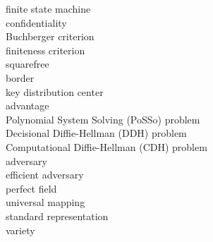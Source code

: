 \begin{latin}
finite state machine\dotfill {}\\
confidentiality\dotfill {}\\
Buchberger criterion\dotfill {}\\
finiteness criterion\dotfill {}\\
squarefree\dotfill {}\\
border\dotfill {}\\
key distribution center\dotfill {}\\
advantage\dotfill {}\\
Polynomial System Solving (PoSSo) problem\dotfill {}\\
Decisional Diffie-Hellman (DDH) problem\dotfill {}\\
Computational Diffie-Hellman (CDH) problem\dotfill {}\\
adversary\dotfill {}\\
efficient adversary\dotfill {}\\
perfect field\dotfill {}\\
universal mapping \dotfill {}\\
standard representation\dotfill {}\\
variety\dotfill {}\\
\end{latin}











